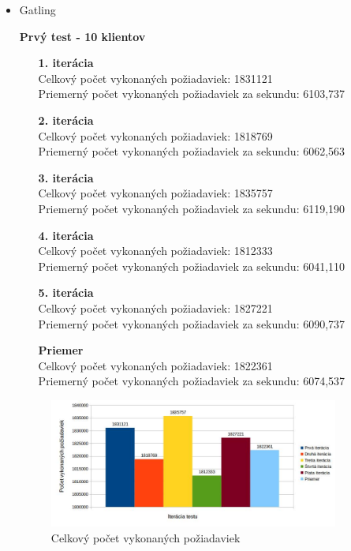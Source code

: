 \documentclass[12pt,oneside,final]{fithesis-utf8}
\begin{document}
\begin{itemize}
\item Gatling

\textbf{Prvý test - 10 klientov}
\begin{itemize}

\item[\textbf{1. iterácia}]\ \\
Celkový počet vykonaných požiadaviek: 1831121\\
Priemerný počet vykonaných požiadaviek za sekundu: 6103,737

\item[\textbf{2. iterácia}]\ \\
Celkový počet vykonaných požiadaviek: 1818769\\
Priemerný počet vykonaných požiadaviek za sekundu: 6062,563

\item[\textbf{3. iterácia}]\ \\
Celkový počet vykonaných požiadaviek: 1835757\\
Priemerný počet vykonaných požiadaviek za sekundu: 6119,190

\item[\textbf{4. iterácia}]\ \\
Celkový počet vykonaných požiadaviek: 1812333\\
Priemerný počet vykonaných požiadaviek za sekundu: 6041,110

\item[\textbf{5. iterácia}]\ \\
Celkový počet vykonaných požiadaviek: 1827221\\
Priemerný počet vykonaných požiadaviek za sekundu: 6090,737

\item[\textbf{Priemer}]\ \\
Celkový počet vykonaných požiadaviek: 1822361\\
Priemerný počet vykonaných požiadaviek za sekundu: 6074,537

\end{itemize}

\begin{figure}[H]
  \centering
      \includegraphics[width=0.9\textwidth]{gatling2_1.jpg}
  \caption{Celkový počet vykonaných požiadaviek}
\end{figure}


\end{itemize}
\end{document}
